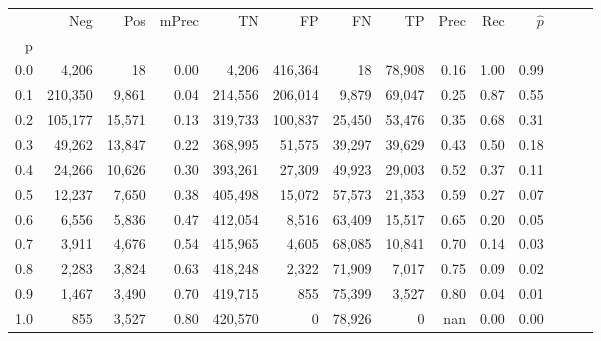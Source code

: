 \begin{tabular}{rrrrrrrrrrrrrr}
\toprule
{} &      Neg &     Pos & mPrec &       TN &       FP &      FN &      TP &  Prec &   Rec & $\hat{p}$ \\
p   &          &         &       &          &          &         &         &       &       &           \\
\midrule
0.0 &    4,206 &      18 &  0.00 &    4,206 &  416,364 &      18 &  78,908 &  0.16 &  1.00 &      0.99 \\
0.1 &  210,350 &   9,861 &  0.04 &  214,556 &  206,014 &   9,879 &  69,047 &  0.25 &  0.87 &      0.55 \\
0.2 &  105,177 &  15,571 &  0.13 &  319,733 &  100,837 &  25,450 &  53,476 &  0.35 &  0.68 &      0.31 \\
0.3 &   49,262 &  13,847 &  0.22 &  368,995 &   51,575 &  39,297 &  39,629 &  0.43 &  0.50 &      0.18 \\
0.4 &   24,266 &  10,626 &  0.30 &  393,261 &   27,309 &  49,923 &  29,003 &  0.52 &  0.37 &      0.11 \\
0.5 &   12,237 &   7,650 &  0.38 &  405,498 &   15,072 &  57,573 &  21,353 &  0.59 &  0.27 &      0.07 \\
0.6 &    6,556 &   5,836 &  0.47 &  412,054 &    8,516 &  63,409 &  15,517 &  0.65 &  0.20 &      0.05 \\
0.7 &    3,911 &   4,676 &  0.54 &  415,965 &    4,605 &  68,085 &  10,841 &  0.70 &  0.14 &      0.03 \\
0.8 &    2,283 &   3,824 &  0.63 &  418,248 &    2,322 &  71,909 &   7,017 &  0.75 &  0.09 &      0.02 \\
0.9 &    1,467 &   3,490 &  0.70 &  419,715 &      855 &  75,399 &   3,527 &  0.80 &  0.04 &      0.01 \\
1.0 &      855 &   3,527 &  0.80 &  420,570 &        0 &  78,926 &       0 &   nan &  0.00 &      0.00 \\
\bottomrule
\end{tabular}
